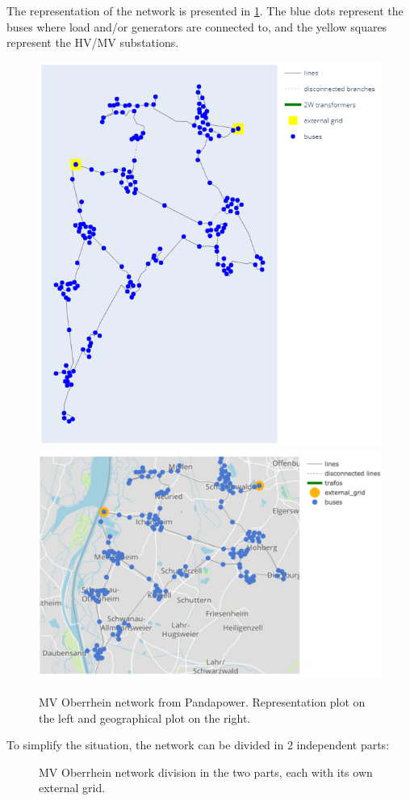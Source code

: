 The representation of the network is presented in \ref{fig:MVober}. The blue dots represent the buses where load and/or generators are connected to, and the yellow squares represent the HV/MV substations.
\begin{figure}[H]
\centering
    \includegraphics[height=.35\linewidth]{images/MVOberr/MVOberr.PNG}
    \includegraphics[height=.35\linewidth,width=.35\linewidth]{images/MVOberr/MVOberrMap1.PNG}
\caption[MV Oberrhein network]{MV Oberrhein network from Pandapower. Representation plot on the left and geographical plot on the right.}
\label{fig:MVober}
\end{figure}

\noindent To simplify the situation, the network can be divided in 2 independent parts:

\begin{figure}[H]
\centering
{}
\caption[MV Oberrhein network division]{MV Oberrhein network division in the two parts, each with its own external grid.}
\end{figure}

